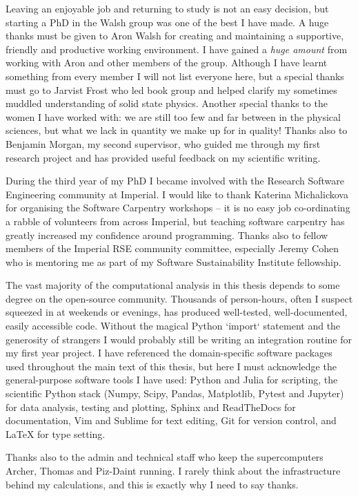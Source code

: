 Leaving an enjoyable job and returning to study is not an easy decision, but starting a PhD in the Walsh group was one of the best I have made. A huge thanks must be given to Aron Walsh for creating and maintaining a supportive, friendly and productive working environment. I have gained a \textit{huge amount} from working with Aron and other members of the group. Although I have learnt something from every member I will not list everyone here, but a special thanks must go to Jarvist Frost who led book group and helped clarify my sometimes muddled understanding of solid state physics. Another special thanks to the women I have worked with: we are still too few and far between in the physical sciences, but what we lack in quantity we make up for in quality! Thanks also to Benjamin Morgan, my second supervisor, who guided me through my first research project and has provided useful feedback on my scientific writing. 

During the third year of my PhD I became involved with the Research Software Engineering community at Imperial. I would like to thank Katerina Michalickova for organising the Software Carpentry workshops -- it is no easy job co-ordinating a rabble of volunteers from across Imperial, but teaching software carpentry has greatly increased my confidence around programming. Thanks also to fellow members of the Imperial RSE community committee, especially Jeremy Cohen who is mentoring me as part of my Software Sustainability Institute fellowship.

The vast majority of the computational analysis in this thesis depends to some degree on the open-source community. Thousands of person-hours, often I suspect squeezed in at weekends or evenings, has produced well-tested, well-documented, easily accessible code. Without the magical Python `import` statement and the generosity of strangers I would probably still be writing an integration routine for my first year project. I have referenced the domain-specific software packages used throughout the main text of this thesis, but here I must acknowledge the general-purpose software tools I have used: Python and Julia for scripting, the scientific Python stack (Numpy, Scipy, Pandas, Matplotlib, Pytest and Jupyter) for data analysis, testing and plotting, Sphinx and ReadTheDocs for documentation, Vim and Sublime for text editing, Git for version control, and LaTeX for type setting.

Thanks also to the admin and technical staff who keep the supercomputers Archer, Thomas and Piz-Daint running. I rarely think about the infrastructure behind my calculations, and this is exactly why I need to say thanks.

